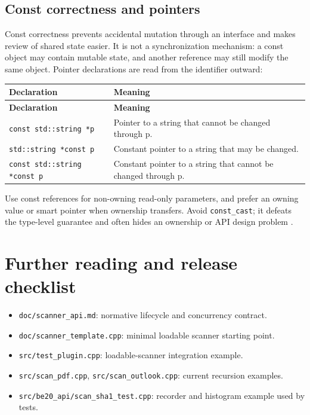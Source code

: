 \documentclass[11pt]{article}
\newcommand{\code}[1]{\texttt{#1}}
\begin{document}
\subsection{Const correctness and pointers}

Const correctness prevents accidental mutation through an interface and makes
review of shared state easier. It is not a synchronization mechanism: a const
object may contain mutable state, and another reference may still modify the
same object. Pointer declarations are read from the identifier outward:

\begin{longtable}{p{.38\linewidth}p{.56\linewidth}}
\hline
\textbf{Declaration} & \textbf{Meaning} \\
\hline
\endfirsthead
\hline
\textbf{Declaration} & \textbf{Meaning} \\
\hline
\endhead
\code{const std::string *p} & Pointer to a string that cannot be changed through p. \\
\code{std::string *const p} & Constant pointer to a string that may be changed. \\
\code{const std::string *const p} & Constant pointer to a string that cannot be changed through p. \\
\hline
\end{longtable}

Use const references for non-owning read-only parameters, and prefer an owning
value or smart pointer when ownership transfers. Avoid \code{const\_cast}; it
defeats the type-level guarantee and often hides an ownership or API design
problem \cite{parashift}.

\clearpage
\section{Further reading and release checklist}

\begin{itemize}
\item \code{doc/scanner\_api.md}: normative lifecycle and concurrency
  contract.
\item \code{doc/scanner\_template.cpp}: minimal loadable scanner starting
  point.
\item \code{src/test\_plugin.cpp}: loadable-scanner integration example.
\item \code{src/scan\_pdf.cpp}, \code{src/scan\_outlook.cpp}: current
  recursion examples.
\item \code{src/be20\_api/scan\_sha1\_test.cpp}: recorder and histogram
  example used by tests.
\end{itemize}
\end{document}
